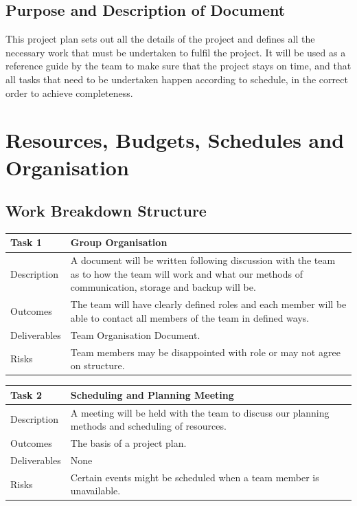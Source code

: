 \documentclass{l3proj}
\begin{document}
\subsection{Purpose and Description of Document}
This project plan sets out all the details of the project and defines all the
necessary work that must be undertaken to 
fulfil the project. It will be used as a reference guide by the team to make
sure that the project stays on time, and that all tasks 
that need to be undertaken happen according to schedule, in the correct order to achieve completeness.

\section{Resources, Budgets, Schedules and Organisation}
\label{sect:rbso}
\subsection{Work Breakdown Structure} 

\begin{center}
    \begin{tabular}{ | l | p{12cm} |}
    \hline	
    Task 1 & Group Organisation \\ \hline
    Description & A document will be written following discussion with the team as to how the
	team will work and what our methods of communication, storage and backup will be. \\ \hline   
    Outcomes & The team will have clearly defined roles and each member will be able to contact all members of the team in defined ways. \\ \hline
    Deliverables & Team Organisation Document. \\ \hline
    Risks & Team members may be disappointed with role or may not agree on structure. \\ 
    \hline
    \end{tabular}
\end{center}

\begin{center}
    \begin{tabular}{ | l | p{12cm} |}
    \hline	
    Task 2 & Scheduling and Planning Meeting \\ \hline
    Description & A meeting will be held with the team to discuss our planning methods and scheduling of resources. \\ \hline   
    Outcomes & The basis of a project plan. \\ \hline
    Deliverables & None \\ \hline
    Risks & Certain events might be scheduled when a team member is unavailable. \\ 
    \hline
    \end{tabular}
\end{center}
\end{document}

